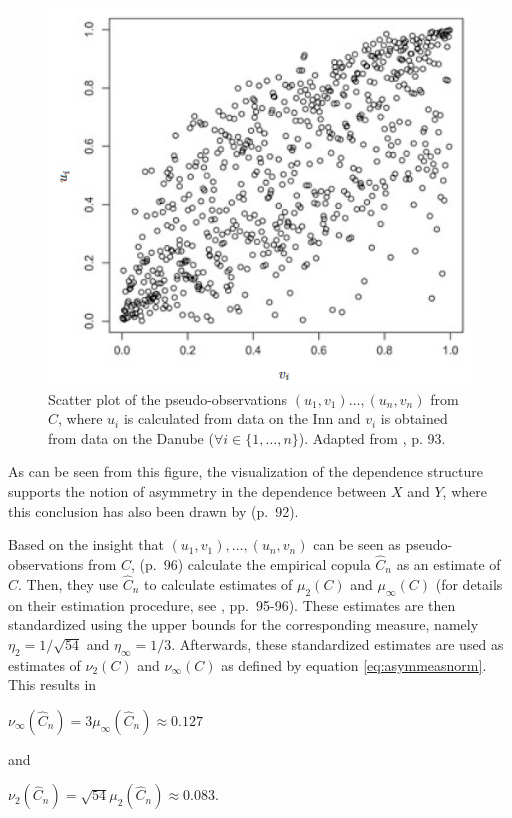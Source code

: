 \documentclass[
]{krantz}
\begin{document}
\begin{figure}

{\centering \includegraphics[width=0.6\linewidth]{./work/04-archimax/figures/Plot_Inn_Danube_raw_adjusted_v02} 

}

\caption{Scatter plot of the pseudo-observations \((u_1, v_1) \ldots, (u_n, v_n)\) from \(C\), where \(u_i\) is calculated from data on the Inn and \(v_i\) is obtained from data on the Danube (\(\forall i \in \{1,\ldots, n\}\)). Adapted from \citet{genest2013}, p. 93.}\label{fig:scatterClaudia}
\end{figure}

As can be seen from this figure, the visualization of the dependence structure supports the notion of asymmetry in the dependence between \(X\) and \(Y\), where this conclusion has also been drawn by \citet{genest2013} (p.~92).

Based on the insight that \((u_1, v_1), \ldots, (u_n, v_n)\) can be seen as pseudo-observations from \(C\), \citet{genest2013} (p.~96) calculate the empirical copula \(\hat{C}_n\) as an estimate of \(C\). Then, they use \(\hat{C}_n\) to calculate estimates of \(\mu_2(C)\) and \(\mu_\infty(C)\) (for details on their estimation procedure, see \citet{genest2013}, pp.~95-96). These estimates are then standardized using the upper bounds for the corresponding measure, namely \(\eta_2=1/\sqrt{54}\) and \(\eta_\infty=1/3\). Afterwards, these standardized estimates are used as estimates of \(\nu_2(C)\) and \(\nu_\infty(C)\) as defined by equation \eqref{eq:asymmeasnorm}. This results in

\(\nu_\infty(\hat{C}_n) = 3 \mu_{\infty}(\hat{C}_n) \approx 0.127\)

and

\(\nu_2(\hat{C}_n) = \sqrt{54} \mu_2(\hat{C}_n) \approx 0.083.\)
\end{document}
